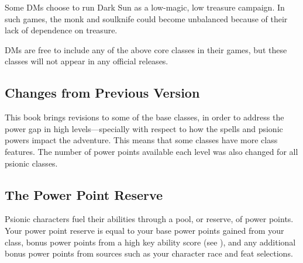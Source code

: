 Some DMs choose to run {\tableheader Dark Sun} as a low-magic, low treasure campaign. In such games, the monk and soulknife could become unbalanced because of their lack of dependence on treasure.

DMs are free to include any of the above core classes in their games, but these classes will not appear in any official releases.

\subsection{Changes from Previous Version}
This book brings revisions to some of the base classes, in order to address the power gap in high levels---specially with respect to how the spells and psionic powers impact the adventure. This means that some classes have more class features. The number of power points available each level was also changed for all psionic classes.

\subsection{The Power Point Reserve}
Psionic characters fuel their abilities through a pool, or reserve, of power points. Your power point reserve is equal to your base power points gained from your class, bonus power points from a high key ability score (see ), and any additional bonus power points from sources such as your character race and feat selections.


